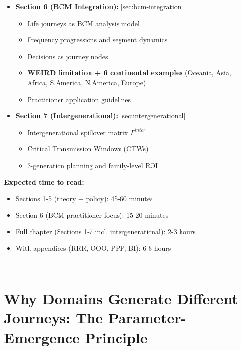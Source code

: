 \begin{tcolorbox}[colback=cyan!5!white, colframe=cyan!75!black, title=Chapter Overview: How This Chapter Is Organized]
\begin{itemize}[nosep]
\item \textbf{Section 6 (BCM Integration):} \ref{sec:bcm-integration}
  \begin{itemize}[nosep]
    \item Life journeys as BCM analysis model
    \item Frequency progressions and segment dynamics
    \item Decisions as journey nodes
    \item \textbf{WEIRD limitation + 6 continental examples} (Oceania, Asia, Africa, S.America, N.America, Europe)
    \item Practitioner application guidelines
  \end{itemize}

\item \textbf{Section 7 (Intergenerational):} \ref{sec:intergenerational}
  \begin{itemize}[nosep]
    \item Intergenerational spillover matrix $\Gamma^{inter}$
    \item Critical Transmission Windows (CTWs)
    \item 3-generation planning and family-level ROI
  \end{itemize}
\end{itemize}

\textbf{Expected time to read:}
\begin{itemize}[nosep]
\item Sections 1-5 (theory + policy): 45-60 minutes
\item Section 6 (BCM practitioner focus): 15-20 minutes
\item Full chapter (Sections 1-7 incl. intergenerational): 2-3 hours
\item With appendices (RRR, OOO, PPP, BI): 6-8 hours
\end{itemize}

\end{tcolorbox}

---


\section{Why Domains Generate Different Journeys: The Parameter-Emergence Principle}
\label{sec:parameter-emergence}

